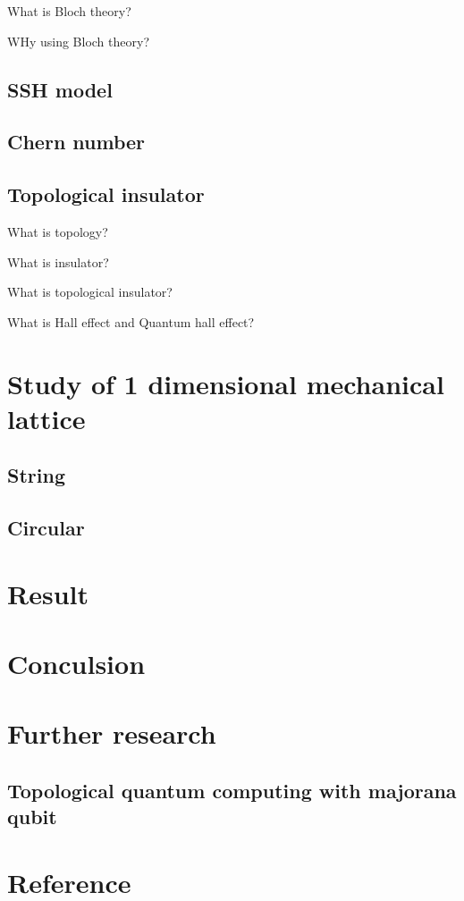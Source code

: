 \documentclass[a4paper]{article}
\begin{document}
\begin{multicols*}{2}
    What is Bloch theory?

    WHy using Bloch theory?

    \subsection{SSH model}

    \subsection{Chern number}

    \subsection{Topological insulator}

    What is topology?

    What is insulator?

    What is topological insulator?

    What is Hall effect and Quantum hall effect?

    \section{Study of 1 dimensional mechanical lattice}

    \subsection{String}

    \subsection{Circular}

    \section{Result}

    \section{Conculsion}

    \section{Further research}

    \subsection{Topological quantum computing with majorana qubit}


    \section{Reference}


\end{multicols*}
\end{document}
